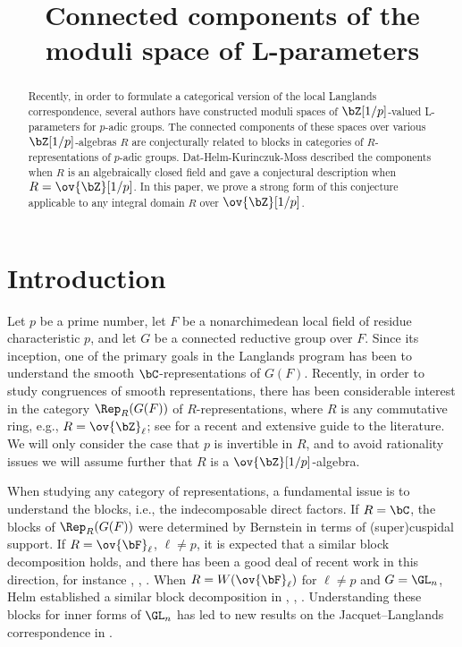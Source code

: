 
\title{Connected components of the moduli space of L-parameters}
\begin{abstract}
Recently, in order to formulate a categorical version of the local Langlands correspondence, several authors have constructed moduli spaces of $\bZ[1/p]$-valued L-parameters for $p$-adic groups. The connected components of these spaces over various $\bZ[1/p]$-algebras $R$ are conjecturally related to blocks in categories of $R$-representations of $p$-adic groups. Dat-Helm-Kurinczuk-Moss described the components when $R$ is an algebraically closed field and gave a conjectural description when $R = \ov{\bZ}[1/p]$. In this paper, we prove a strong form of this conjecture applicable to any integral domain $R$ over $\ov{\bZ}[1/p]$.
\end{abstract}
\maketitle

\section{Introduction}

Let $p$ be a prime number, let $F$ be a nonarchimedean local field of residue characteristic $p$, and let $G$ be a connected reductive group over $F$. Since its inception, one of the primary goals in the Langlands program has been to understand the smooth $\bC$-representations of $G(F)$. Recently, in order to study congruences of smooth representations, there has been considerable interest in the category $\Rep_R(G(F))$ of $R$-representations, where $R$ is any commutative ring, e.g., $R = \ov{\bZ}_\ell$; see \cite{Vigneras-ICM} for a recent and extensive guide to the literature. We will only consider the case that $p$ is invertible in $R$, and to avoid rationality issues we will assume further that $R$ is a $\ov{\bZ}[1/p]$-algebra. \smallskip

When studying any category of representations, a fundamental issue is to understand the blocks, i.e., the indecomposable direct factors. If $R = \bC$, the blocks of $\Rep_R(G(F))$ were determined by Bernstein \cite{Bernstein-Deligne} in terms of (super)cuspidal support. If $R = \ov{\bF}_\ell$, $\ell \neq p$, it is expected that a similar block decomposition holds, and there has been a good deal of recent work in this direction, for instance \cite{Secherre-Stevens-block}, \cite{Drevon-Secherre}, \cite{Cui-support}. When $R = W(\ov{\bF}_\ell)$ for $\ell \neq p$ and $G = \GL_n$, Helm established a similar block decomposition in \cite{Helm1}, \cite{Helm2}, \cite{Helm3}. Understanding these blocks for inner forms of $\GL_n$ has led to new results on the Jacquet--Langlands correspondence in \cite{Secherre-Stevens}.\smallskip

